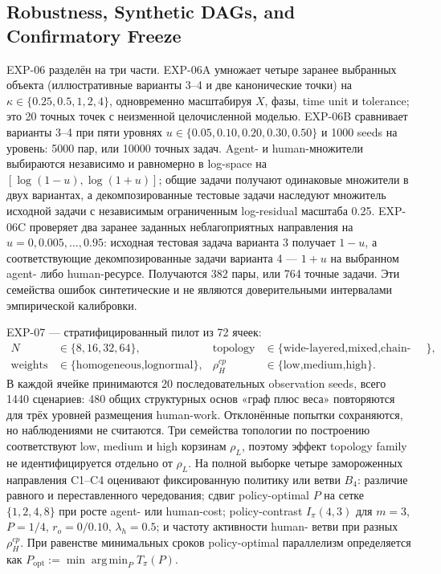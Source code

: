 \subsection{Robustness, Synthetic DAGs, and Confirmatory Freeze}

EXP-06 разделён на три части. EXP-06A умножает четыре заранее выбранных объекта
(иллюстративные варианты 3--4 и две канонические точки) на
$\kappa\in\{0.25,0.5,1,2,4\}$, одновременно масштабируя $X$, фазы, time unit и
tolerance; это 20 точных точек с неизменной целочисленной моделью. EXP-06B
сравнивает варианты 3--4 при пяти уровнях
$u\in\{0.05,0.10,0.20,0.30,0.50\}$ и 1000 seeds на уровень: 5000 пар, или
10000 точных задач. Agent- и human-множители выбираются независимо и равномерно
в log-space на $[\log(1-u),\log(1+u)]$; общие задачи получают одинаковые
множители в двух вариантах, а декомпозированные тестовые задачи наследуют
множитель исходной задачи с независимым ограниченным log-residual масштаба
0.25. EXP-06C проверяет два заранее заданных неблагоприятных направления на
$u=0,0.005,\ldots,0.95$: исходная тестовая задача варианта 3 получает
$1-u$, а соответствующие декомпозированные задачи варианта 4 --- $1+u$ на
выбранном agent- либо human-ресурсе. Получаются 382 пары, или 764 точные
задачи. Эти семейства ошибок синтетические и не являются доверительными
интервалами эмпирической калибровки.

EXP-07 --- стратифицированный пилот из 72 ячеек:
\[
\begin{aligned}
N &\in \{8,16,32,64\}, &
\text{topology} &\in \{\text{wide-layered,mixed,chain-like}\},\\
\text{weights} &\in \{\text{homogeneous,lognormal}\}, &
\rho_H^{cp} &\in \{\text{low,medium,high}\}.
\end{aligned}
\]
В каждой ячейке принимаются 20 последовательных observation seeds, всего 1440
сценариев: 480 общих структурных основ «граф плюс веса» повторяются для трёх
уровней размещения human-work. Отклонённые попытки сохраняются, но наблюдениями
не считаются. Три
семейства топологии по построению соответствуют low, medium и high корзинам
$\rho_L$, поэтому эффект topology family не идентифицируется отдельно от
$\rho_L$. На полной выборке четыре замороженных направления C1--C4 оценивают
фиксированную политику или ветви $B_4$: различие равного и переставленного
чередования; сдвиг policy-optimal $P$ на сетке $\{1,2,4,8\}$ при росте
agent- или human-cost; policy-contrast $I_\pi(4,3)$ для
$m=3$, $P=1/4$, $r_o=0/0.10$, $\lambda_h=0.5$; и частоту активности human-
ветви при разных $\rho_H^{cp}$. При равенстве минимальных сроков policy-optimal
параллелизм определяется как
$P_{\mathrm{opt}}:=\min\operatorname*{arg\,min}_{P}T_\pi(P)$.

